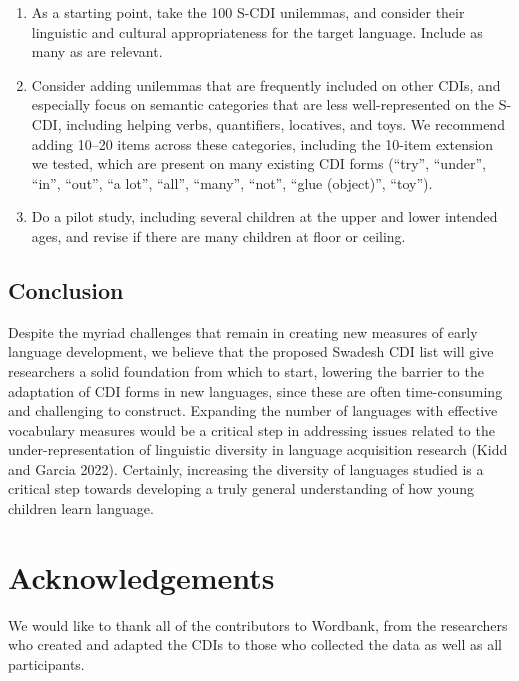 \documentclass[
  letterpaper,
  DIV=11,
  numbers=noendperiod]{scrartcl}
\providecommand{\tightlist}{%
  \setlength{\itemsep}{0pt}\setlength{\parskip}{0pt}}\usepackage{longtable,booktabs,array}
\begin{document}
\begin{enumerate}
\def\labelenumi{\arabic{enumi}.}
\tightlist
\item
  As a starting point, take the 100 S-CDI unilemmas, and consider their
  linguistic and cultural appropriateness for the target language.
  Include as many as are relevant.
\item
  Consider adding unilemmas that are frequently included on other CDIs,
  and especially focus on semantic categories that are less
  well-represented on the S-CDI, including helping verbs, quantifiers,
  locatives, and toys. We recommend adding 10--20 items across these
  categories, including the 10-item extension we tested, which are
  present on many existing CDI forms (``try'', ``under'', ``in'',
  ``out'', ``a lot'', ``all'', ``many'', ``not'', ``glue (object)'',
  ``toy'').
\item
  Do a pilot study, including several children at the upper and lower
  intended ages, and revise if there are many children at floor or
  ceiling.
\end{enumerate}

\subsection{Conclusion}\label{conclusion}

Despite the myriad challenges that remain in creating new measures of
early language development, we believe that the proposed Swadesh CDI
list will give researchers a solid foundation from which to start,
lowering the barrier to the adaptation of CDI forms in new languages,
since these are often time-consuming and challenging to construct.
Expanding the number of languages with effective vocabulary measures
would be a critical step in addressing issues related to the
under-representation of linguistic diversity in language acquisition
research (Kidd and Garcia 2022). Certainly, increasing the diversity of
languages studied is a critical step towards developing a truly general
understanding of how young children learn language.

\section{Acknowledgements}\label{acknowledgements}

We would like to thank all of the contributors to Wordbank, from the
researchers who created and adapted the CDIs to those who collected the
data as well as all participants.
\end{document}
